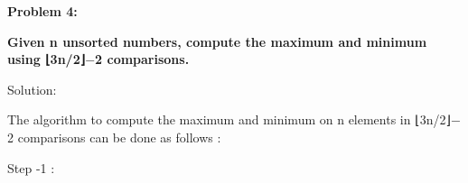 \documentclass[letterpaper,portrait,12pt]{article}
\begin{document}
\begin{flushleft}

\end{flushleft}


\begin{flushleft}

\end{flushleft}


\begin{flushleft}

\end{flushleft}


\begin{flushleft}

\end{flushleft}


\begin{flushleft}
	
\end{flushleft}


\begin{flushleft}
\textbf{Problem 4:}
\end{flushleft}


\begin{flushleft}
\textbf{	}\textbf{Given n unsorted numbers, compute the maximum and minimum using ⌊3n/2⌋$-$2 comparisons.}
\end{flushleft}


\begin{flushleft}

\end{flushleft}


\begin{flushleft}
Solution:
\end{flushleft}


\begin{flushleft}

\end{flushleft}


\begin{flushleft}
The algorithm to compute the maximum and minimum on n elements in ⌊3n/2⌋$-$2 comparisons can be done as follows :
\end{flushleft}


\begin{flushleft}

\end{flushleft}


\begin{flushleft}
Step -1 :
\end{flushleft}
\end{document}
